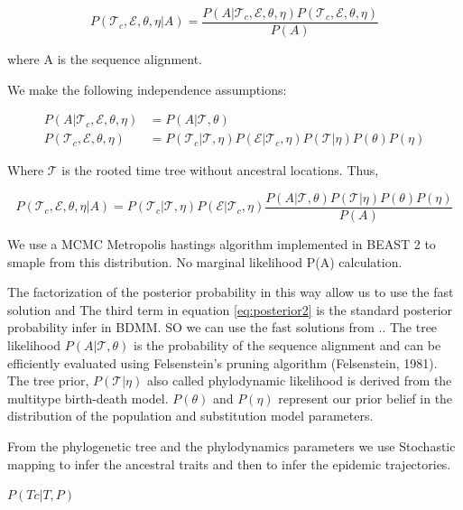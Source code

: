 \begin{equation}
P(\mathcal{T}_c, \mathcal{E}, \theta, \eta | A ) = \frac{P(A | \mathcal{T}_c, \mathcal{E}, \theta, \eta ) P(\mathcal{T}_c, \mathcal{E}, \theta, \eta)}{P(A)}
\label{eq:posterior1}
\end{equation}

where A is the sequence alignment.

We make the following independence assumptions:

\begin{align}
P(A | \mathcal{T}_c, \mathcal{E}, \theta, \eta ) &= P(A | \mathcal{T},\theta )\\
P(\mathcal{T}_c, \mathcal{E}, \theta, \eta) &= P(\mathcal{T}_c|\mathcal{T}, \eta) P(\mathcal{E}|\mathcal{T}_c, \eta) P(\mathcal{T} | \eta ) P(\theta) P(\eta)
\label{eq:assumptions}
\end{align}


Where $\mathcal{T}$ is the rooted time tree without ancestral locations. Thus,

\begin{equation}
P(\mathcal{T}_c, \mathcal{E}, \theta, \eta | A) = P(\mathcal{T}_c|\mathcal{T}, \eta) P(\mathcal{E}|\mathcal{T}_c, \eta) \frac{P(A | \mathcal{T}, \theta) P(\mathcal{T} | \eta) P(\theta) P(\eta)}{P(A)}
\label{eq:posterior2}
\end{equation}

We use a MCMC Metropolis hastings algorithm implemented in BEAST 2 to smaple from this distribution. No marginal likelihood P(A) calculation.

The factorization of the posterior probability in this way allow us to use the fast solution and The third term in equation \ref{eq:posterior2} is the standard posterior probability infer in BDMM. SO we can use the fast solutions from ..
{}
The tree likelihood $P(A | \mathcal{T},\theta )$ is the probability of the sequence alignment and can be efficiently evaluated using Felsenstein’s pruning algorithm (Felsenstein, 1981). The tree prior, $P(\mathcal{T} | \eta)$ also called phylodynamic likelihood is derived from the multitype birth-death model. $P(\theta)$ and $P(\eta)$ represent our prior belief in the distribution of the population and substitution model parameters. 

From the phylogenetic tree and the phylodynamics parameters we use Stochastic mapping to infer the ancestral traits and then to infer the epidemic trajectories.

$P(Tc | T, P)$

